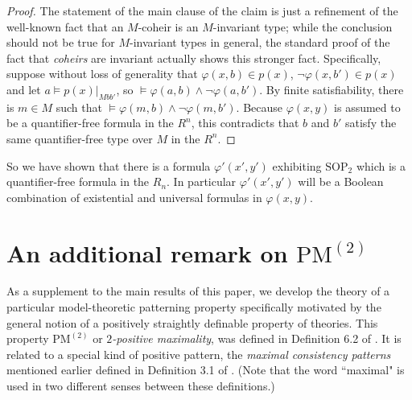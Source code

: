 \documentclass{article}
\theoremstyle{definition}
\theoremstyle{definition}
\theoremstyle{definition}
\begin{document}
\begin{proof}

The statement of the main clause of the claim is just a refinement of the well-known fact that an $M$-coheir is an $M$-invariant type; while the conclusion should not be true for $M$-invariant types in general, the standard proof of the fact that \textit{coheirs} are invariant actually shows this stronger fact.  Specifically, suppose without loss of generality that $\varphi(x, b) \in p(x)$, $\neg\varphi(x, b') \in p(x)$ and let $a \models p(x)|_{Mbb'}$, so $\models \varphi(a, b) \wedge \neg\varphi(a,b')$. By finite satisfiability, there is $m \in M$ such that 
$\models \varphi(m, b) \wedge \neg\varphi(m,b')$. Because $\varphi(x, y)$ is assumed to be a quantifier-free formula in the $R^{n}$, this contradicts that $b$ and $b'$ satisfy the same quantifier-free type over $M$ in the $R^{n}$.


    
\end{proof}


So we have shown that there is a formula $\varphi'(x', y')$ exhibiting $\mathrm{SOP}_{2}$ which is a quantifier-free formula in the $R_{n}$. In particular $\varphi'(x', y')$ will be a Boolean combination of existential and universal formulas in $\varphi(x, y)$. 

\section{An additional remark on $\mathrm{PM}^{(2)}$}


As a supplement to the main results of this paper, we develop the theory of a particular model-theoretic patterning property specifically motivated by the general notion of a positively straightly definable property of theories. This property $\mathrm{PM}^{(2)}$  or \textit{$2$-positive maximality}, was defined in Definition 6.2 of \cite{bailetti2024walk}. It is related to a special kind of positive pattern, the \textit{maximal consistency patterns} mentioned earlier defined in Definition 3.1 of \cite{garcia2022model}. (Note that the word ``maximal" is used in two different senses between these definitions.)
\end{document}
